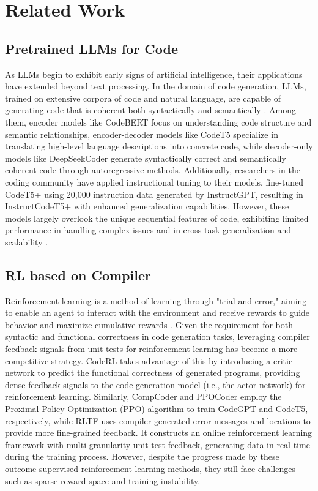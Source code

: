 \section{Related Work}
\subsection{Pretrained LLMs for Code}
As LLMs begin to exhibit early signs of artificial intelligence, their applications have extended beyond text processing. In the domain of code generation, LLMs, trained on extensive corpora of code and natural language, are capable of generating code that is coherent both syntactically and semantically \citep{jiang2024survey,guo2020graphcodebert,li2022competition,nijkamp2022codegen}. Among them, encoder models like CodeBERT \citep{feng2020codebert} focus on understanding code structure and semantic relationships, encoder-decoder models like CodeT5 \citep{wang2021codet5} specialize in translating high-level language descriptions into concrete code, while decoder-only models like DeepSeekCoder \citep{guo2024deepseek} generate syntactically correct and semantically coherent code through autoregressive methods. Additionally, researchers in the coding community have applied instructional tuning to their models. \citet{wang2023codet5+} fine-tuned CodeT5+ using 20,000 instruction data generated by InstructGPT, resulting in InstructCodeT5+ with enhanced generalization capabilities. However, these models largely overlook the unique sequential features of code, exhibiting limited performance in handling complex issues and in cross-task generalization and scalability \citep{zhang2024deep}.

\subsection{RL based on Compiler}
Reinforcement learning is a method of learning through "trial and error," aiming to enable an agent to interact with the environment and receive rewards to guide behavior and maximize cumulative rewards \citep{mnih2013playing,mnih2015human,van2016deep}. Given the requirement for both syntactic and functional correctness in code generation tasks, leveraging compiler feedback signals from unit tests for reinforcement learning has become a more competitive strategy. CodeRL \citep{le2022coderl} takes advantage of this by introducing a critic network to predict the functional correctness of generated programs, providing dense feedback signals to the code generation model (i.e., the actor network) for reinforcement learning. Similarly, CompCoder \citep{wang2022compilable} and PPOCoder \citep{shojaee2023execution} employ the Proximal Policy Optimization (PPO) algorithm to train CodeGPT and CodeT5, respectively, while RLTF \citep{liu2023rltf} uses compiler-generated error messages and locations to provide more fine-grained feedback. It constructs an online reinforcement learning framework with multi-granularity unit test feedback, generating data in real-time during the training process. However, despite the progress made by these outcome-supervised reinforcement learning methods, they still face challenges such as sparse reward space and training instability.

